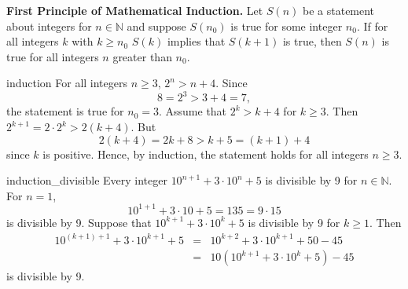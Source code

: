 \medskip

\noindent
{\bf First Principle of Mathematical Induction.} 
Let $S(n)$ be a statement about integers for  $n \in {\mathbb N}$ and suppose $S(n_0)$ is true for some integer $n_0$.  If for all integers $k$ with $k \geq n_0$ $S(k)$ implies that $S(k+1)$ is true, then $S(n)$ is true for all integers $n$ greater than $n_0$.  

\begin{example}{induction}
For all integers $n \geq 3$, $2^n > n + 4$. Since
$$
8 = 2^3 > 3 + 4 = 7,
$$
the statement is true for $n_0 = 3$.  Assume that $2^k > k + 4$ for $k \geq 3$.  Then $2^{k + 1} = 2 \cdot 2^{k} > 2(k + 4)$.  But 
$$
2(k + 4) = 2k + 8 > k + 5 = (k + 1) + 4
$$
since $k$ is positive.  Hence, by induction, the statement holds for all integers $n \geq 3$. 
\end{example}

\begin{example}{induction_divisible}
Every integer $10^{n + 1} + 3 \cdot 10^n + 5$ is divisible by 9 for $n \in {\mathbb N}$.  For $n = 1$, 
$$
10^{1 + 1} + 3 \cdot 10 + 5 = 135 = 9 \cdot 15
$$
is divisible by 9.  Suppose that $10^{k + 1} + 3 \cdot 10^k + 5$ is divisible by 9 for $k \geq 1$.  Then 
\begin{eqnarray*}
10^{(k + 1) + 1} + 3 \cdot 10^{k + 1} + 5
& = &
10^{k + 2} + 3 \cdot 10^{k + 1} + 50 - 45 \\
& = &
10 (10^{k + 1} + 3 \cdot 10^{k} + 5) - 45
\end{eqnarray*}
is divisible by 9.
\end{example}

